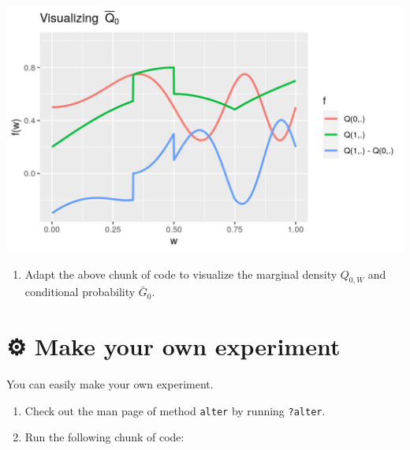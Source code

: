 \documentclass[
  11pt,
  openright,twoside]{book}
\providecommand{\tightlist}{%
  \setlength{\itemsep}{0pt}\setlength{\parskip}{0pt}}
\newcommand{\gear}{\usebox{\gearbox}\;}
\newcommand{\Gbar}{\bar{G}}
\theoremstyle{definition}
\theoremstyle{definition}
\theoremstyle{definition}
\theoremstyle{definition}
\theoremstyle{remark}
\begin{document}
\begin{center}\includegraphics[width=0.7\linewidth]{img/exercise:visualize-1} \end{center}

\begin{enumerate}
\def\labelenumi{\arabic{enumi}.}
\setcounter{enumi}{1}
\tightlist
\item
  Adapt the above chunk of code to visualize the marginal density \(Q_{0,W}\)
  and conditional probability \(\Gbar_{0}\).
\end{enumerate}

\hypertarget{exo-make-own-experiment}{%
\section{\texorpdfstring{⚙ \gear Make your own experiment}{⚙ Make your own experiment}}\label{exo-make-own-experiment}}

You can easily make your own experiment.

\begin{enumerate}
\def\labelenumi{\arabic{enumi}.}
\item
  Check out the man page of method \texttt{alter} by running \texttt{?alter}.
\item
  Run the following chunk of code:
\end{enumerate}
\end{document}
